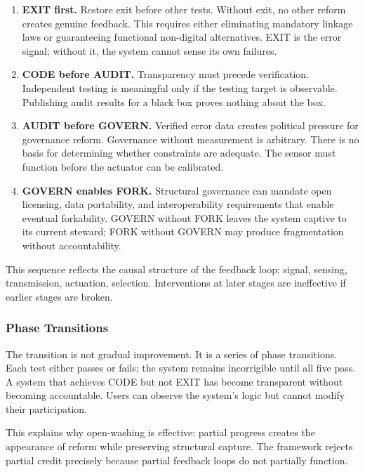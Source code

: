 \documentclass{article}
\begin{document}
\begin{enumerate}
    \item \textbf{EXIT first.} Restore exit before other tests. Without exit, no other reform creates genuine feedback. This requires either eliminating mandatory linkage laws or guaranteeing functional non-digital alternatives. EXIT is the error signal; without it, the system cannot sense its own failures.

    \item \textbf{CODE before AUDIT.} Transparency must precede verification. Independent testing is meaningful only if the testing target is observable. Publishing audit results for a black box proves nothing about the box.

    \item \textbf{AUDIT before GOVERN.} Verified error data creates political pressure for governance reform. Governance without measurement is arbitrary. There is no basis for determining whether constraints are adequate. The sensor must function before the actuator can be calibrated.

    \item \textbf{GOVERN enables FORK.} Structural governance can mandate open licensing, data portability, and interoperability requirements that enable eventual forkability. GOVERN without FORK leaves the system captive to its current steward; FORK without GOVERN may produce fragmentation without accountability.
\end{enumerate}

This sequence reflects the causal structure of the feedback loop: signal, sensing, transmission, actuation, selection. Interventions at later stages are ineffective if earlier stages are broken.

\subsubsection{Phase Transitions}

The transition is not gradual improvement. It is a series of phase transitions. Each test either passes or fails; the system remains incorrigible until all five pass. A system that achieves CODE but not EXIT has become transparent without becoming accountable. Users can observe the system's logic but cannot modify their participation.

This explains why open-washing is effective: partial progress creates the appearance of reform while preserving structural capture. The framework rejects partial credit precisely because partial feedback loops do not partially function.
\end{document}
